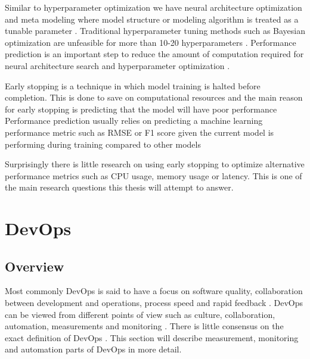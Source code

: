 Similar to hyperparameter optimization we have neural architecture optimization and meta modeling where model structure or modeling algorithm is treated as a tunable parameter \parencite{bakerAcceleratingNeuralArchitecture2017}.
Traditional hyperparameter tuning methods such as Bayesian optimization are unfeasible for more than 10-20 hyperparameters \parencite{maclaurinGradientbasedHyperparameterOptimization2015}.
Performance prediction is an important step to reduce the amount of computation required for neural architecture search and hyperparameter optimization \parencite{bakerAcceleratingNeuralArchitecture2017}.

Early stopping is a technique in which model training is halted before completion. %
This is done to save on computational resources and the main reason for early stopping is predicting that the model will have poor performance %
Performance prediction usually relies on predicting a machine learning performance metric such as RMSE or F1 score given the current model is performing during training compared to other models %

Surprisingly there is little research on using early stopping to optimize alternative performance metrics such as CPU usage, memory usage or latency. This is one of the main research questions this thesis will attempt to answer. %


\section{DevOps} %
\label{sec:devops}

\subsection{Overview}

Most commonly DevOps is said to have a focus on software quality, collaboration between development and operations, process speed and rapid feedback \parencite{mishraDevOpsSoftwareQuality2020,wallerIncludingPerformanceBenchmarks2015, pereraImproveSoftwareQuality2017}. DevOps can be viewed from different points of view such as culture, collaboration, automation, measurements and monitoring \parencite{mishraDevOpsSoftwareQuality2020, wallerIncludingPerformanceBenchmarks2015}. There is little consensus on the exact definition of DevOps \parencite{smedsDevOpsDefinitionPerceived2015}. This section will describe measurement, monitoring and automation parts of DevOps in more detail.

